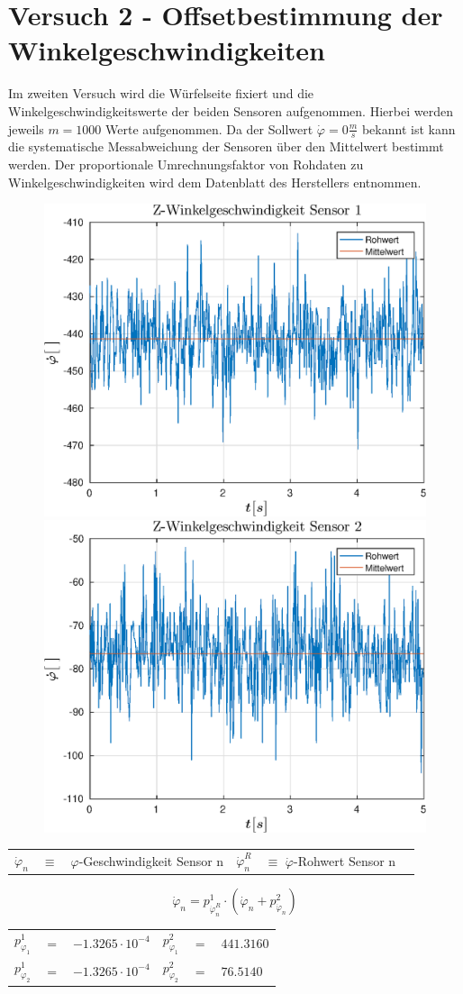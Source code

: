 \section{Versuch 2 - Offsetbestimmung der Winkelgeschwindigkeiten}
Im zweiten Versuch wird die Würfelseite fixiert und die Winkelgeschwindigkeitswerte der beiden Sensoren aufgenommen. Hierbei werden jeweils $m = 1000$ Werte aufgenommen. Da der Sollwert $\dot{\varphi} = 0 \frac{m}{s}$ bekannt ist kann die systematische Messabweichung der Sensoren über den Mittelwert bestimmt werden. Der proportionale Umrechnungsfaktor von Rohdaten zu Winkelgeschwindigkeiten wird dem Datenblatt des Herstellers entnommen.

\begin{figure}[h]
	\includegraphics[width=0.5\linewidth]{img/phi1__d.eps}
	\includegraphics[width=0.5\linewidth]{img/phi2__d.eps}
\end{figure}

\begin{table}[h]
\centering
\begin{tabular}{lcllcl}
$\dot{\varphi}_n$ & $\equiv$ & $\varphi$-Geschwindigkeit Sensor n & $\dot{\varphi}^R_n$ & $\equiv$ $\dot{\varphi}$-Rohwert Sensor n
\end{tabular}
\end{table}

\begin{equation}
\dot{\varphi}_n = p^1_{\dot{\varphi}^R_n}  \cdot (\dot{\varphi}_n + p^2_{\dot{\varphi}_n})
\end{equation}

\begin{table}[h]
\centering
\begin{tabular}{lcllcl}
$p^1_{\varphi_1}$ &$=$& $-1.3265 \cdot 10^{-4}$ & $p^2_{\varphi_1}$ &$=$& $441.3160$ \\
$p^1_{\varphi_2}$ &$=$& $-1.3265 \cdot 10^{-4}$ & $p^2_{\varphi_2}$ &$=$& $76.5140$ \\
\end{tabular}
\end{table}